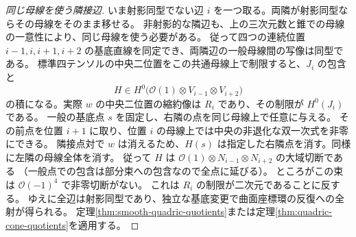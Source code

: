 \begin{proof}[同じ母線を使う隣接辺]
いま射影同型でない辺 $i$ を一つ取る。両隣が射影同型ならその母線をそのまま移せる。
非射影的な隣辺も、上の三次元数と錐での母線の一意性により、同じ母線を使う必要がある。
従って四つの連続位置 $i-1,i,i+1,i+2$ の基底直線を同定でき、両隣辺の一般母線間の写像は同型である。
標準四テンソルの中央二位置をこの共通母線上で制限すると、$J_i$ の包含と
\[
         H\in H^0\big(\mathcal O(1)\otimes V_{i-1}\otimes V_{i+2}\big)
\]
の積になる。実際 $w$ の中央二位置の縮約像は $R_i$ であり、その制限が $H^0(J_i)$ である。
一般の基底点 $s$ を固定し、右隣の点を同じ母線上で任意に与える。
その前点を位置 $i+1$ に取り、位置 $i$ の母線上では中央の非退化な双一次式を非零にできる。
隣接点対で $w$ は消えるため、$H(s)$ は指定した右隣点を消す。同様に左隣の母線全体を消す。
従って $H$ は $\mathcal O(1)\otimes N_{i-1}\otimes N_{i+2}$ の大域切断である
（一般点での包含は部分束への包含なので全点に延びる）。
ところがこの束は $\mathcal O(-1)^4$ で非零切断がない。
これは $R_i$ の制限が二次元であることに反する。
ゆえに全辺は射影同型であり、独立な基底変更で曲面座標環の反復への全射が得られる。
定理\ref{thm:smooth-quadric-quotients}または定理\ref{thm:quadric-cone-quotients}を適用する。
\end{proof}

